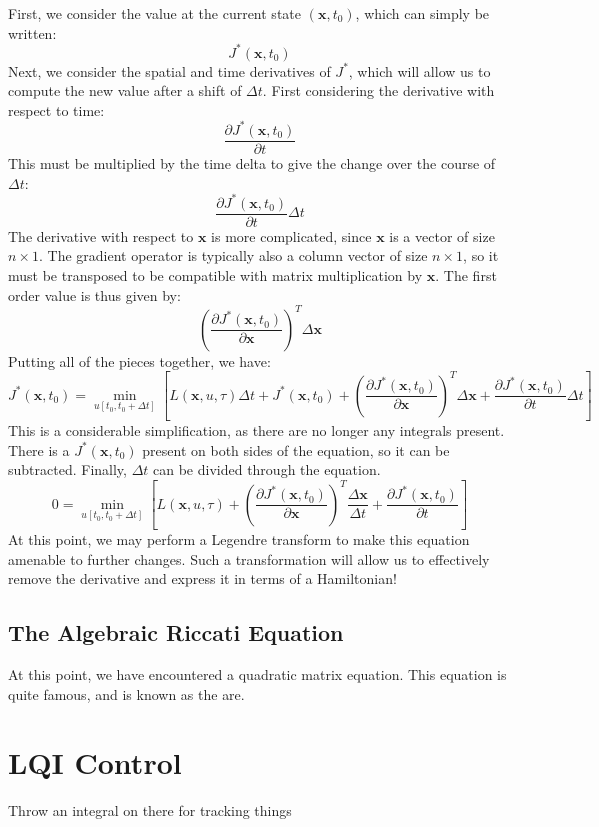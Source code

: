 First, we consider the value at the current state $(\bm{x},t_0)$, which can simply be written:
$$J^*(\bm{x},t_0)$$
Next, we consider the spatial and time derivatives of $J^*$, which will allow us to compute the new value after a shift of $\Delta t$. First considering the derivative with respect to time:
$$\frac{\partial J^*(\bm{x},t_0)}{\partial t}$$
This must be multiplied by the time delta to give the change over the course of $\Delta t$:
$$\frac{\partial J^*(\bm{x},t_0)}{\partial t}\Delta t$$
The derivative with respect to $\bm{x}$ is more complicated, since $\bm{x}$ is a vector of size $n \times 1$. The gradient operator is typically also a column vector of size $n\times1$, so it must be transposed to be compatible with matrix multiplication by $\bm{x}$. The first order value is thus given by:
$$\left(\frac{\partial J^*(\bm{x},t_0)}{\partial \bm{x}}\right)^T\Delta \bm{x}$$
Putting all of the pieces together, we have:
$$J^*(\bm{x},t_0)=\min_{u[t_0,t_0+\Delta t]}\left[L(\bm{x},u,\tau)\Delta t+J^*(\bm{x},t_0)+\left(\frac{\partial J^*(\bm{x},t_0)}{\partial \bm{x}}\right)^T\Delta \bm{x}+\frac{\partial J^*(\bm{x},t_0)}{\partial t}\Delta t\right]$$
This is a considerable simplification, as there are no longer any integrals present. There is a $J^*(\bm{x},t_0)$ present on both sides of the equation, so it can be subtracted. Finally, $\Delta t$ can be divided through the equation.
$$0=\min_{u[t_0,t_0+\Delta t]}\left[L(\bm{x},u,\tau)+\left(\frac{\partial J^*(\bm{x},t_0)}{\partial \bm{x}}\right)^T\frac{\Delta \bm{x}}{\Delta t}+\frac{\partial J^*(\bm{x},t_0)}{\partial t}\right]$$
At this point, we may perform a Legendre transform to make this equation amenable to further changes. Such a transformation will allow us to effectively remove the derivative and express it in terms of a Hamiltonian!


\subsection{The Algebraic Riccati Equation}
At this point, we have encountered a quadratic matrix equation. This equation is quite famous, and is known as the \gls{are}. 



\section{LQI Control}

Throw an integral on there for tracking things




